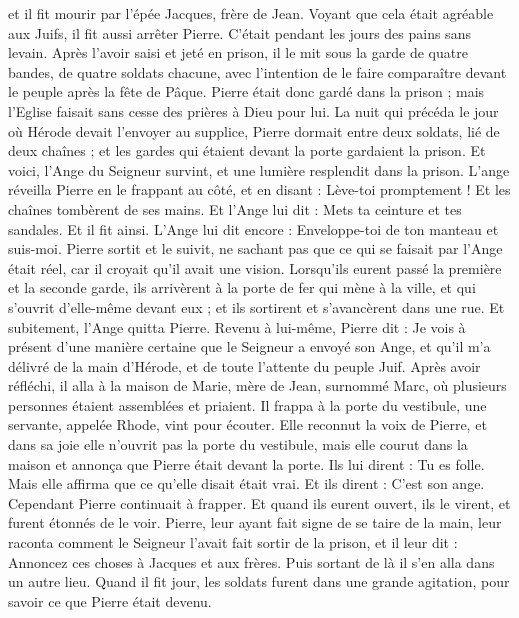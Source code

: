 \begin{multicols}{2}
et il fit mourir par l'épée Jacques, frère de Jean.
Voyant que cela était agréable aux Juifs, il fit aussi arrêter Pierre. C’était pendant les jours des pains sans levain.
Après l’avoir saisi et jeté en prison, il le mit sous la garde de quatre bandes, de quatre soldats chacune, avec l’intention de le faire comparaître devant le peuple après la fête de Pâque.
Pierre était donc gardé dans la prison ; mais l'Eglise faisait sans cesse des prières à Dieu pour lui.
La nuit qui précéda le jour où Hérode devait l’envoyer au supplice, Pierre dormait entre deux soldats, lié de deux chaînes ; et les gardes qui étaient devant la porte gardaient la prison.
Et voici, l’Ange du Seigneur survint, et une lumière resplendit dans la prison. L’ange réveilla Pierre en le frappant au côté, et en disant : Lève-toi promptement ! Et les chaînes tombèrent de ses mains.
Et l'Ange lui dit : Mets ta ceinture et tes sandales. Et il fit ainsi. L’Ange lui dit encore : Enveloppe-toi de ton manteau et suis-moi.
Pierre sortit et le suivit, ne sachant pas que ce qui se faisait par l’Ange était réel, car il croyait qu’il avait une vision.
Lorsqu’ils eurent passé la première et la seconde garde, ils arrivèrent à la porte de fer qui mène à la ville, et qui s’ouvrit d’elle-même devant eux ; et ils sortirent et s’avancèrent dans une rue. Et subitement, l'Ange quitta Pierre.
Revenu à lui-même, Pierre dit : Je vois à présent d’une manière certaine que le Seigneur a envoyé son Ange, et qu'il m'a délivré de la main d'Hérode, et de toute l'attente du peuple Juif.
Après avoir réfléchi, il alla à la maison de Marie, mère de Jean, surnommé Marc, où plusieurs personnes étaient assemblées et priaient.
Il frappa à la porte du vestibule, une servante, appelée Rhode, vint pour écouter.
Elle reconnut la voix de Pierre, et dans sa joie elle n'ouvrit pas la porte du vestibule, mais elle courut dans la maison et annonça que Pierre était devant la porte.
Ils lui dirent : Tu es folle. Mais elle affirma que ce qu'elle disait était vrai.
Et ils dirent : C’est son ange. Cependant Pierre continuait à frapper. Et quand ils eurent ouvert, ils le virent, et furent étonnés de le voir.
Pierre, leur ayant fait signe de se taire de la main, leur raconta comment le Seigneur l'avait fait sortir de la prison, et il leur dit : Annoncez ces choses à Jacques et aux frères. Puis sortant de là il s'en alla dans un autre lieu.
Quand il fit jour, les soldats furent dans une grande agitation, pour savoir ce que Pierre était devenu.

\end{multicols}
